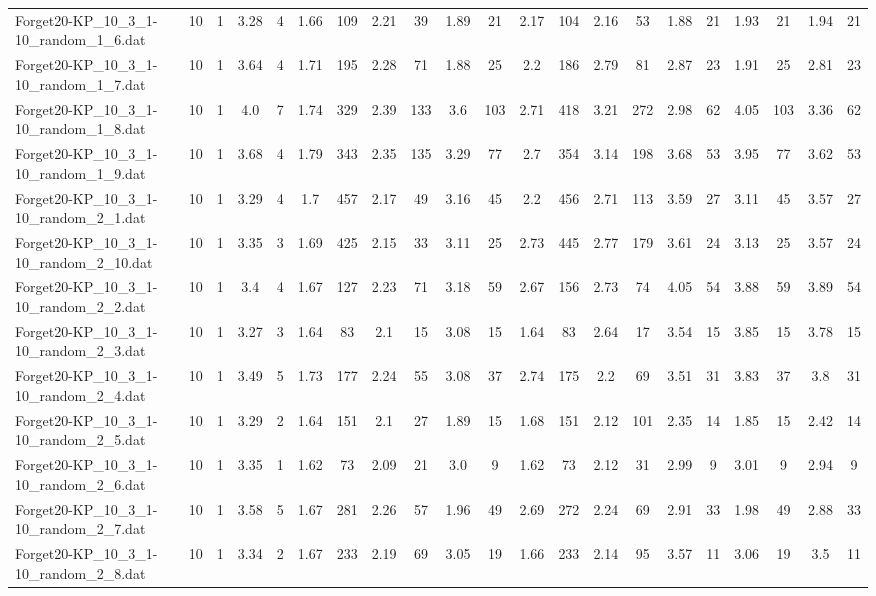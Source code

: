 \begin{sidewaystable}[!ht]
{\begin{tabular}{lcccccccccccccccccccc}
Forget20-KP\_10\_3\_1-10\_random\_1\_6.dat & 10 & 1 & 3.28 & 4 & 1.66 & 109 & 2.21 & 39 & 1.89 & 21 & 2.17 & 104 & 2.16 & 53 & 1.88 & 21 & 1.93 & 21 & 1.94 & 21 \\
Forget20-KP\_10\_3\_1-10\_random\_1\_7.dat & 10 & 1 & 3.64 & 4 & 1.71 & 195 & 2.28 & 71 & 1.88 & 25 & 2.2 & 186 & 2.79 & 81 & 2.87 & 23 & 1.91 & 25 & 2.81 & 23 \\
Forget20-KP\_10\_3\_1-10\_random\_1\_8.dat & 10 & 1 & 4.0 & 7 & 1.74 & 329 & 2.39 & 133 & 3.6 & 103 & 2.71 & 418 & 3.21 & 272 & 2.98 & 62 & 4.05 & 103 & 3.36 & 62 \\
Forget20-KP\_10\_3\_1-10\_random\_1\_9.dat & 10 & 1 & 3.68 & 4 & 1.79 & 343 & 2.35 & 135 & 3.29 & 77 & 2.7 & 354 & 3.14 & 198 & 3.68 & 53 & 3.95 & 77 & 3.62 & 53 \\
Forget20-KP\_10\_3\_1-10\_random\_2\_1.dat & 10 & 1 & 3.29 & 4 & 1.7 & 457 & 2.17 & 49 & 3.16 & 45 & 2.2 & 456 & 2.71 & 113 & 3.59 & 27 & 3.11 & 45 & 3.57 & 27 \\
Forget20-KP\_10\_3\_1-10\_random\_2\_10.dat & 10 & 1 & 3.35 & 3 & 1.69 & 425 & 2.15 & 33 & 3.11 & 25 & 2.73 & 445 & 2.77 & 179 & 3.61 & 24 & 3.13 & 25 & 3.57 & 24 \\
Forget20-KP\_10\_3\_1-10\_random\_2\_2.dat & 10 & 1 & 3.4 & 4 & 1.67 & 127 & 2.23 & 71 & 3.18 & 59 & 2.67 & 156 & 2.73 & 74 & 4.05 & 54 & 3.88 & 59 & 3.89 & 54 \\
Forget20-KP\_10\_3\_1-10\_random\_2\_3.dat & 10 & 1 & 3.27 & 3 & 1.64 & 83 & 2.1 & 15 & 3.08 & 15 & 1.64 & 83 & 2.64 & 17 & 3.54 & 15 & 3.85 & 15 & 3.78 & 15 \\
Forget20-KP\_10\_3\_1-10\_random\_2\_4.dat & 10 & 1 & 3.49 & 5 & 1.73 & 177 & 2.24 & 55 & 3.08 & 37 & 2.74 & 175 & 2.2 & 69 & 3.51 & 31 & 3.83 & 37 & 3.8 & 31 \\
Forget20-KP\_10\_3\_1-10\_random\_2\_5.dat & 10 & 1 & 3.29 & 2 & 1.64 & 151 & 2.1 & 27 & 1.89 & 15 & 1.68 & 151 & 2.12 & 101 & 2.35 & 14 & 1.85 & 15 & 2.42 & 14 \\
Forget20-KP\_10\_3\_1-10\_random\_2\_6.dat & 10 & 1 & 3.35 & 1 & 1.62 & 73 & 2.09 & 21 & 3.0 & 9 & 1.62 & 73 & 2.12 & 31 & 2.99 & 9 & 3.01 & 9 & 2.94 & 9 \\
Forget20-KP\_10\_3\_1-10\_random\_2\_7.dat & 10 & 1 & 3.58 & 5 & 1.67 & 281 & 2.26 & 57 & 1.96 & 49 & 2.69 & 272 & 2.24 & 69 & 2.91 & 33 & 1.98 & 49 & 2.88 & 33 \\
Forget20-KP\_10\_3\_1-10\_random\_2\_8.dat & 10 & 1 & 3.34 & 2 & 1.67 & 233 & 2.19 & 69 & 3.05 & 19 & 1.66 & 233 & 2.14 & 95 & 3.57 & 11 & 3.06 & 19 & 3.5 & 11 \\

\end{tabular}}
\end{sidewaystable}
